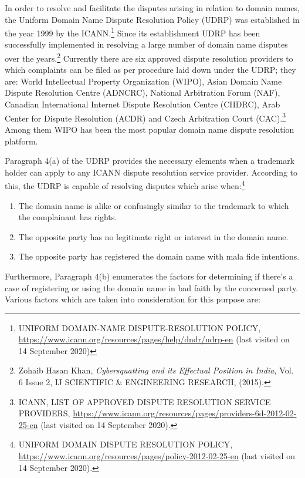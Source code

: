 \begin{multicols}{2}
\noi
In order to resolve and facilitate the disputes arising in relation to domain names, the Uniform
Domain Name Dispute Resolution Policy (UDRP) was established in the year 1999 by the
ICANN.\footnote{UNIFORM DOMAIN-NAME DISPUTE-RESOLUTION POLICY,
\url{https://www.icann.org/resources/pages/help/dndr/udrp-en} (last visited on 14 September 2020)} Since its establishment UDRP has been successfully implemented in resolving a
large number of domain name disputes over the years.\footnote{Zohaib Hasan Khan, \textit{Cybersquatting and its Effectual Position in India,} Vol. 6 Issue 2, IJ SCIENTIFIC \& ENGINEERING RESEARCH, (2015).} Currently there are six approved
dispute resolution providers to which complaints can be filed as per procedure laid down
under the UDRP; they are: World Intellectual Property Organization (WIPO), Asian Domain
Name Dispute Resolution Centre (ADNCRC), National Arbitration Forum (NAF), Canadian
International Internet Dispute Resolution Centre (CIIDRC), Arab Center for Dispute
Resolution (ACDR) and Czech Arbitration Court (CAC).\footnote{ICANN, LIST OF APPROVED DISPUTE RESOLUTION SERVICE PROVIDERS, \url{https://www.icann.org/resources/pages/providers-6d-2012-02-25-en} (last visited on 14 September 2020).} Among them WIPO has been the most popular domain name dispute resolution platform.

\noi
Paragraph 4(a) of the UDRP provides the necessary elements when a trademark holder can
apply to any ICANN dispute resolution service provider. According to this, the UDRP is
capable of resolving disputes which arise when:\footnote{UNIFORM DOMAIN DISPUTE RESOLUTION POLICY,
\url{https://www.icann.org/resources/pages/policy-2012-02-25-en} (last visited on 14 September 2020).}

\begin{enumerate}[label=$\bullet$]
\item The domain name is alike or confusingly similar to the trademark to which the
complainant has rights.

\item The opposite party has no legitimate right or interest in the domain name.

\item The opposite party has registered the domain name with mala fide intentions.
\end{enumerate}

\noi
Furthermore, Paragraph 4(b) enumerates the factors for determining if there’s a case of
registering or using the domain name in bad faith by the concerned party. Various factors
which are taken into consideration for this purpose are:


\end{multicols}
